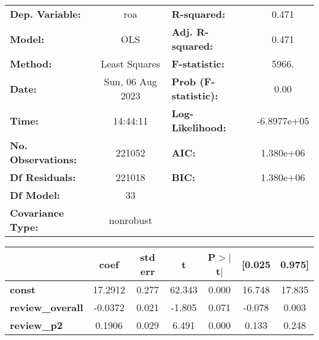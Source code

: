 \begin{center}
\begin{tabular}{lclc}
\toprule
\textbf{Dep. Variable:}                                               &       roa        & \textbf{  R-squared:         } &      0.471   \\
\textbf{Model:}                                                       &       OLS        & \textbf{  Adj. R-squared:    } &      0.471   \\
\textbf{Method:}                                                      &  Least Squares   & \textbf{  F-statistic:       } &      5966.   \\
\textbf{Date:}                                                        & Sun, 06 Aug 2023 & \textbf{  Prob (F-statistic):} &      0.00    \\
\textbf{Time:}                                                        &     14:44:11     & \textbf{  Log-Likelihood:    } & -6.8977e+05  \\
\textbf{No. Observations:}                                            &      221052      & \textbf{  AIC:               } &  1.380e+06   \\
\textbf{Df Residuals:}                                                &      221018      & \textbf{  BIC:               } &  1.380e+06   \\
\textbf{Df Model:}                                                    &          33      & \textbf{                     } &              \\
\textbf{Covariance Type:}                                             &    nonrobust     & \textbf{                     } &              \\
\bottomrule
\end{tabular}
\begin{tabular}{lcccccc}
                                                                      & \textbf{coef} & \textbf{std err} & \textbf{t} & \textbf{P$> |$t$|$} & \textbf{[0.025} & \textbf{0.975]}  \\
\midrule
\textbf{const}                                                        &      17.2912  &        0.277     &    62.343  &         0.000        &       16.748    &       17.835     \\
\textbf{review\_overall}                                              &      -0.0372  &        0.021     &    -1.805  &         0.071        &       -0.078    &        0.003     \\
\textbf{review\_p2}                                                   &       0.1906  &        0.029     &     6.491  &         0.000        &        0.133    &        0.248     \\

\end{tabular}
\end{center}
